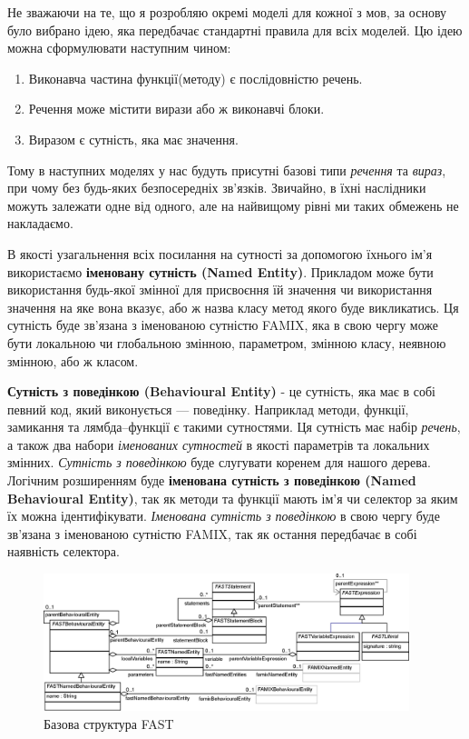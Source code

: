 \documentclass[12pt,a4paper]{article}
\begin{document}
Не зважаючи на те, що я розробляю окремі моделі для кожної з мов, за основу було вибрано ідею, яка передбачає стандартні правила для всіх моделей. Цю ідею можна сформулювати наступним чином:
\begin{enumerate}
  \item Виконавча частина функції(методу) є послідовністю речень.
  \item Речення може містити вирази або ж виконавчі блоки.
  \item Виразом є сутність, яка має значення.
\end{enumerate}
Тому в наступних моделях у нас будуть присутні базові типи \emph{речення} та \emph{вираз}, при чому без будь-яких безпосередніх зв'язків. Звичайно, в їхні наслідники можуть залежати одне від одного, але на найвищому рівні ми таких обмежень не накладаємо.

В якості узагальнення всіх посилання на сутності за допомогою їхнього ім'я використаємо \textbf{іменовану сутність (Named Entity)}. Прикладом може бути використання будь-якої змінної для присвоєння їй значення чи використання значення на яке вона вказує, або ж назва класу метод якого буде викликатись. Ця сутність буде зв'язана з іменованою сутністю FAMIX, яка в свою чергу може бути локальною чи глобальною змінною, параметром, змінною класу, неявною змінною, або ж класом.

\textbf{Сутність з поведінкою (Behavioural Entity)} - це сутність, яка має в собі певний код, який виконується --- поведінку. Наприклад методи, функції, замикання та лямбда--функції є такими сутностями. Ця сутність має набір \emph{речень}, а також два набори \emph{іменованих сутностей} в якості параметрів та локальних змінних. \emph{Сутність з поведінкою} буде слугувати коренем для нашого дерева. Логічним розширенням буде \textbf{іменована сутність з поведінкою (Named Behavioural Entity)}, так як методи та функції мають ім'я чи селектор за яким їх можна ідентифікувати. \emph{Іменована сутність з поведінкою} в свою чергу буде зв'язана з іменованою сутністю FAMIX, так як остання передбачає в собі наявність селектора.

\begin{figure}[h]
  \centering
    \includegraphics[width=0.95\textwidth]{GeneralASTClassDiagram}
  \caption{Базова структура FAST\label{genFast}}
\end{figure}
\end{document}

